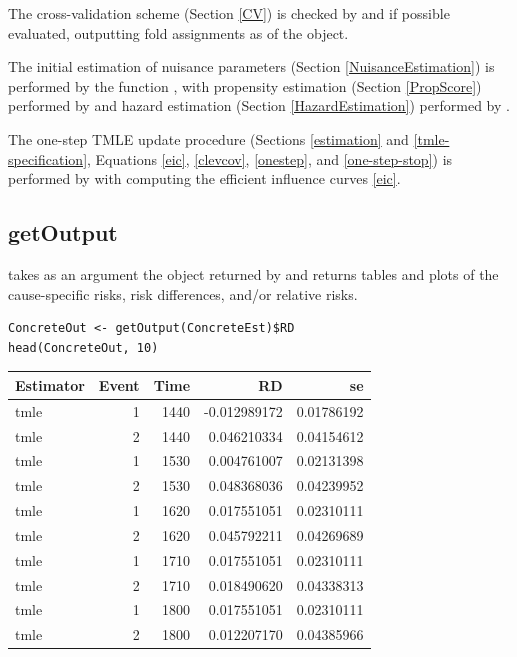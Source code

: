 \documentclass{report}
\newcommand{\1}{\ensuremath{\mathbf{1}}}
\begin{document}
The cross-validation scheme (Section \ref{CV}) is checked by  and if possible evaluated, outputting fold assignments as  of the  object.

The initial estimation of nuisance parameters (Section \ref{NuisanceEstimation}) is performed by the function , with propensity estimation (Section \ref{PropScore}) performed by  and hazard estimation (Section \ref{HazardEstimation}) performed by .

The one-step TMLE update procedure (Sections \ref{estimation} and \ref{tmle-specification}, Equations \eqref{eic}, \eqref{clevcov}, \eqref{onestep}, and \eqref{one-step-stop}) is performed by  with  computing the efficient influence curves \eqref{eic}.

\subsection{getOutput}
\label{getoutput}
 takes as an argument the  object returned by  and returns tables and plots of the cause-specific risks, risk differences, and/or relative risks.

\begin{lstlisting}
ConcreteOut <- getOutput(ConcreteEst)$RD
head(ConcreteOut, 10)
\end{lstlisting}

\begin{center}
\begin{tabular}{lrrrr}
Estimator & Event & Time & RD & se\\
\hline
tmle & 1 & 1440 & -0.012989172 & 0.01786192\\
tmle & 2 & 1440 & 0.046210334 & 0.04154612\\
tmle & 1 & 1530 & 0.004761007 & 0.02131398\\
tmle & 2 & 1530 & 0.048368036 & 0.04239952\\
tmle & 1 & 1620 & 0.017551051 & 0.02310111\\
tmle & 2 & 1620 & 0.045792211 & 0.04269689\\
tmle & 1 & 1710 & 0.017551051 & 0.02310111\\
tmle & 2 & 1710 & 0.018490620 & 0.04338313\\
tmle & 1 & 1800 & 0.017551051 & 0.02310111\\
tmle & 2 & 1800 & 0.012207170 & 0.04385966\\
\end{tabular}
\end{center}
\end{document}

